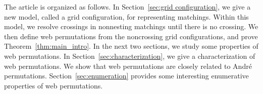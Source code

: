 The article is organized as follows.
In Section~\ref{sec:grid configuration}, we give a new model,
called a grid configuration, for representing matchings.
Within this model, we resolve crossings in nonnesting matchings
until there is no crossing.
We then define web permutations from the noncrossing grid configurations,
and prove Theorem~\ref{thm:main_intro}.
In the next two sections, we study some properties of web permutations.
In Section~\ref{sec:characterization}, we give a characterization of
web permutations. We show that web permutations are closely related to
Andr\'e permutations.
Section~\ref{sec:enumeration} provides some interesting enumerative properties
of web permutations.
